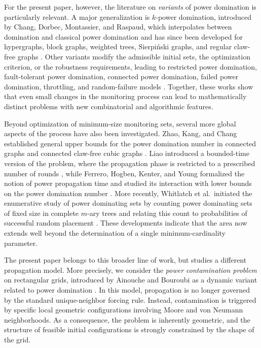 \documentclass[letterpaper,12pt]{article}
\begin{document}
For the present paper, however, the literature on \emph{variants} of power domination is particularly relevant. A major generalization is \(k\)-power domination, introduced by Chang, Dorbec, Montassier, and Raspaud, which interpolates between domination and classical power domination and has since been developed for hypergraphs, block graphs, weighted trees, Sierpiński  graphs,  and regular claw-free graphs \cite{Dorbec2014, ChangDorbecMontassierRaspaud2012,ChangRoussel2015,WangChenLu2016,ChengLuZhou2020,ChenLuYe2022}. Other variants modify the admissible initial sets, the optimization criterion, or the robustness requirements, leading to restricted power domination, fault-tolerant power domination, connected power domination, failed power domination, throttling, and random-failure models \cite{PaiChangWang2010,BozemanBrimkovEricksonFerreroFlaggHogben2019,BrimkovMikesellSmith2019,GlasserJacobLedermanRadziszowski2020,BrimkovCarlsonHicksPatelSmith2019,GanesamurthySrimathiJeyaranjani2025,BjorkmanBrennanFlaggKoch2026}. Together, these works show that even small changes in the monitoring process can lead to mathematically distinct problems with new combinatorial and algorithmic features.

Beyond optimization of minimum-size monitoring sets, several more global aspects of the process have also been investigated. Zhao, Kang, and Chang established general upper bounds for the power domination number in connected graphs and connected claw-free cubic graphs \cite{ZhaoKangChang2006}. Liao introduced a bounded-time version of the problem, where the propagation phase is restricted to a prescribed number of rounds \cite{Liao2016}, while Ferrero, Hogben, Kenter, and Young formalized the notion of power propagation time and studied its interaction with lower bounds on the power domination number \cite{FerreroHogbenKenterYoung2017}. More recently, Whitlatch et al.\ initiated the enumerative study of power dominating sets by counting power dominating sets of fixed size in complete \(m\)-ary trees and relating this count to probabilities of successful random placement \cite{WhitlatchShultisRamirezOrtizKniahnitskaya2023}. These developments indicate that the area now extends well beyond the determination of a single minimum-cardinality parameter.

The present paper belongs to this broader line of work, but studies a different propagation model. More precisely, we consider the \emph{power contamination problem} on rectangular grids, introduced by Ainouche and Bouroubi as a dynamic variant related to power domination \cite{Ainouche2021}. In this model, propagation is no longer governed by the standard unique-neighbor forcing rule. Instead, contamination is triggered by specific local geometric configurations involving Moore and von Neumann neighborhoods. As a consequence, the problem is inherently geometric, and the structure of feasible initial configurations is strongly constrained by the shape of the grid.
\end{document}
